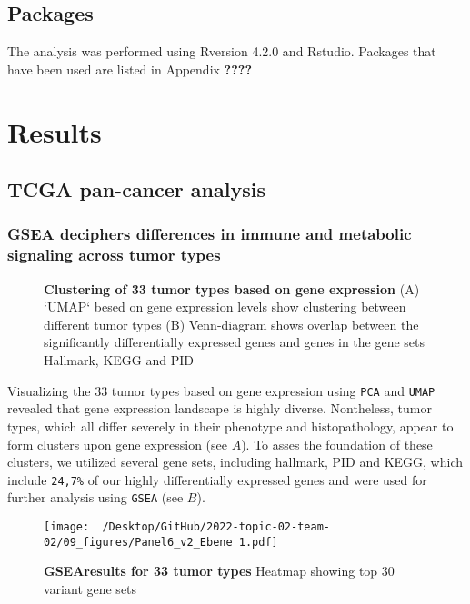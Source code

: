 \documentclass[
  parskip,
  oneside]{scrreprt}
\begin{document}
\hypertarget{packages}{%
\section{Packages}\label{packages}}

The analysis was performed using Rversion 4.2.0 and Rstudio. Packages
that have been used are listed in Appendix \textbf{????}

\hypertarget{results}{%
\chapter{Results}\label{results}}

\hypertarget{tcga-pan-cancer-analysis-1}{%
\section{TCGA pan-cancer analysis}\label{tcga-pan-cancer-analysis-1}}

\hypertarget{gsea-deciphers-differences-in-immune-and-metabolic-signaling-across-tumor-types}{%
\subsection{GSEA deciphers differences in immune and metabolic signaling
across tumor
types}\label{gsea-deciphers-differences-in-immune-and-metabolic-signaling-across-tumor-types}}

\begin{figure}[h]
  \caption{\textbf{Clustering of 33 tumor types based on gene expression} (A) `UMAP` besed on gene expression levels show clustering between different tumor types (B) Venn-diagram shows overlap between the significantly differentially expressed genes and genes in the gene sets Hallmark, KEGG and PID}
  \label{UMAP}
\end{figure}

Visualizing the 33 tumor types based on gene expression using
\texttt{PCA} and \texttt{UMAP} revealed that gene expression landscape
is highly diverse. Nontheless, tumor types, which all differ severely in
their phenotype and histopathology, appear to form clusters upon gene
expression (see  \(A\)). To asses the foundation of these
clusters, we utilized several gene sets, including hallmark, PID and
KEGG, which include \texttt{24,7\%} of our highly differentially
expressed genes and were used for further analysis using \texttt{GSEA}
(see  \(B\)).

\begin{figure}[h]
 \begin{center}
   \texttt{[image: ~/Desktop/GitHub/2022-topic-02-team-02/09\_figures/Panel6\_v2\_Ebene 1.pdf]}
  \end{center}
  \caption{\textbf{GSEAresults for 33 tumor types} Heatmap showing top 30 variant gene sets}
  \label{hm}
\end{figure}
\end{document}
